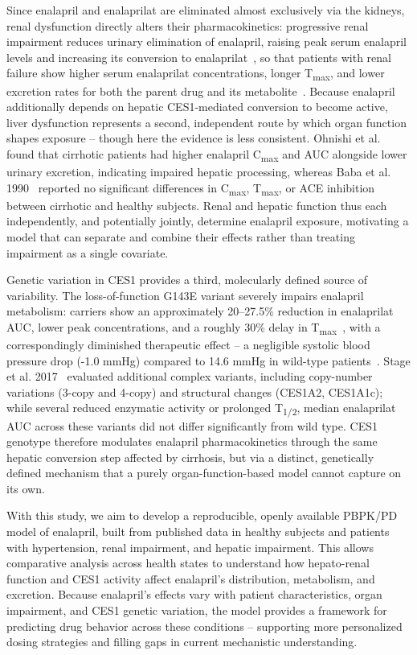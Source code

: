 Since enalapril and enalaprilat are eliminated almost exclusively via the kidneys, renal dysfunction directly alters their pharmacokinetics: progressive renal impairment reduces urinary elimination of enalapril, raising peak serum enalapril levels and increasing its conversion to enalaprilat~\cite{Fruncillo1987}, so that patients with renal failure show higher serum enalaprilat concentrations, longer T\textsubscript{max}, and lower excretion rates for both the parent drug and its metabolite~\cite{Kelly1986, Lowenthal1985}. Because enalapril additionally depends on hepatic CES1-mediated conversion to become active, liver dysfunction represents a second, independent route by which organ function shapes exposure -- though here the evidence is less consistent. Ohnishi et al.~\cite{Ohnishi1989} found that cirrhotic patients had higher enalapril C\textsubscript{max} and AUC alongside lower urinary excretion, indicating impaired hepatic processing, whereas Baba et al. 1990~\cite{Baba1990} reported no significant differences in C\textsubscript{max}, T\textsubscript{max}, or ACE inhibition between cirrhotic and healthy subjects. Renal and hepatic function thus each independently, and potentially jointly, determine enalapril exposure, motivating a model that can separate and combine their effects rather than treating impairment as a single covariate.

Genetic variation in CES1 provides a third, molecularly defined source of variability. The loss-of-function G143E variant severely impairs enalapril metabolism: carriers show an approximately 20--27.5\% reduction in enalaprilat AUC, lower peak concentrations, and a roughly 30\% delay in T\textsubscript{max}~\cite{Her2021, Tarkiainen2015}, with a correspondingly diminished therapeutic effect -- a negligible systolic blood pressure drop (-1.0 mmHg) compared to 14.6 mmHg in wild-type patients~\cite{Her2021}. Stage et al. 2017~\cite{Stage2017} evaluated additional complex variants, including copy-number variations (3-copy and 4-copy) and structural changes (CES1A2, CES1A1c); while several reduced enzymatic activity or prolonged T\textsubscript{1/2}, median enalaprilat AUC across these variants did not differ significantly from wild type. CES1 genotype therefore modulates enalapril pharmacokinetics through the same hepatic conversion step affected by cirrhosis, but via a distinct, genetically defined mechanism that a purely organ-function-based model cannot capture on its own.

With this study, we aim to develop a reproducible, openly available PBPK/PD model of enalapril, built from published data in healthy subjects and patients with hypertension, renal impairment, and hepatic impairment. This allows comparative analysis across health states to understand how hepato-renal function and CES1 activity affect enalapril's distribution, metabolism, and excretion. Because enalapril's effects vary with patient characteristics, organ impairment, and CES1 genetic variation, the model provides a framework for predicting drug behavior across these conditions -- supporting more personalized dosing strategies and filling gaps in current mechanistic understanding.